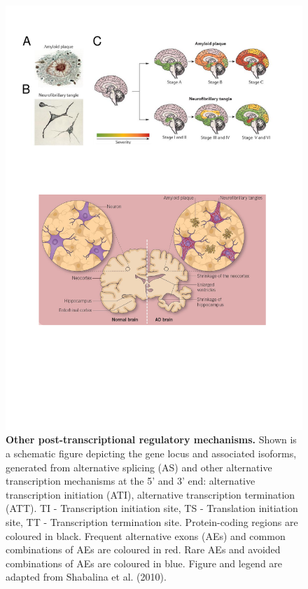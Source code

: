 \vspace{1cm}
\begin{figure}[!ht]
	\centering
	\includegraphics[page=14,trim={0 15cm 1cm 2cm},clip, scale = 0.65]{Figures/Introduction_Figures.pdf}
	\captionsetup{width=0.95\textwidth,singlelinecheck=off}
	\caption[Other post-transcriptional regulatory mechanisms]%
	{\textbf{Other post-transcriptional regulatory mechanisms.} Shown is a schematic figure depicting the gene locus and associated isoforms, generated from alternative splicing (AS) and other alternative transcription mechanisms at the 5' and 3' end: alternative transcription initiation (ATI), alternative transcription termination (ATT). \newline
	TI - Transcription initiation site, TS - Translation initiation site, TT - Transcription termination site. Protein-coding regions are coloured in black. Frequent alternative exons (AEs) and common combinations of AEs are coloured in red. Rare AEs and avoided combinations of AEs are coloured in blue. Figure and legend are adapted from Shabalina et al. (2010)\cite{Shabalina2010}.
	}
	\label{fig:AS_others}
\end{figure}

